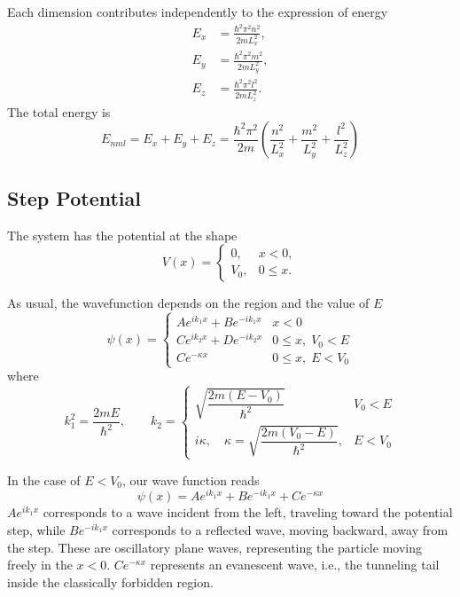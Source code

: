 \documentclass[../../../main.tex]{subfiles}
\begin{document}
Each dimension contributes independently to the expression of energy
\begin{align*}
    E_x & = \frac{\hbar^2 \pi^2 n^2}{2 m L_x^2}, \\
    E_y & = \frac{\hbar^2 \pi^2 m^2}{2 m L_y^2}, \\
    E_z & = \frac{\hbar^2 \pi^2 l^2}{2 m L_z^2}.
\end{align*}
The total energy is
\begin{equation*}
    E_{nml} = E_x + E_y + E_z = \frac{\hbar^2 \pi^2}{2 m} \left( \frac{n^2}{L_x^2} + \frac{m^2}{L_y^2} + \frac{l^2}{L_z^2} \right)
\end{equation*}

\subsection{Step Potential}
The system has the potential at the shape
\begin{equation*}
    V(x) =
    \begin{cases}
        0,   & x < 0,   \\
        V_0, & 0\leq x.
    \end{cases}
\end{equation*}

As usual, the wavefunction depends on the region and the value of $E$
\begin{equation*}
    \psi(x)=
    \begin{cases}
            A e^{i k_1 x} + B e^{-i k_1 x}&x <0\\
            C e^{i k_2 x} + D e^{-i k_2 x} & 0 \leq x,\; V_0 < E \\
            C e^{-\kappa x}                & 0 \leq x,\;E < V_0
    \end{cases}
\end{equation*}
where
\begin{equation*}
    k_1^2 =\frac{2 m E}{\hbar^2}    ,
    \qquad
    k_2 =
    \begin{cases}
        \sqrt{\dfrac{2 m (E - V_0)}{\hbar^2}}&V_0<E\\
        i \kappa, \quad \kappa = \sqrt{\dfrac{2 m (V_0 - E)}{\hbar^2}}, & E < V_0 
    \end{cases}
\end{equation*}

In the case of $E<V_0$, our wave function reads
\begin{equation*}
    \psi(x)=Ae^{ik_1x}+Be^{-ik_1x}+Ce^{-\kappa x}
\end{equation*}
$Ae^{ik_1x}$ corresponds to a wave incident from the left, traveling toward the potential step, while $Be^{-ik_1x}$ corresponds to a reflected wave, moving backward, away from the step.
These are oscillatory plane waves, representing the particle moving freely in the $x<0$.
$Ce^{-\kappa x}$ represents an evanescent wave, i.e., the tunneling tail inside the classically forbidden region.
\end{document}
